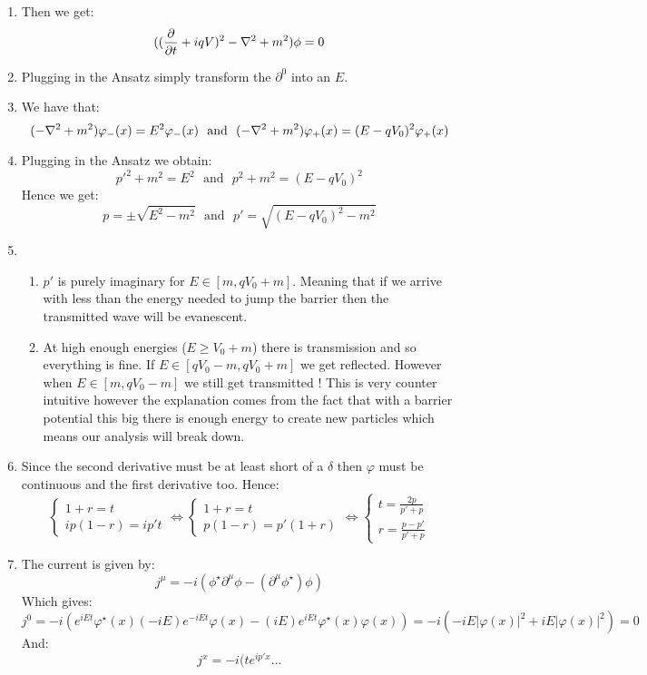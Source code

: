 \documentclass[10pt,a4paper]{book}
\begin{document}
\begin{enumerate}

\item Then we get:
\[
((\pdv{}{t} + i q V)^2 - \laplacian + m^2) \phi = 0
\]

\item Plugging in the Ansatz simply transform the $\partial^0$ into an $E$.

\item We have that:
\[
(-\laplacian + m^2) \varphi_-(x) = E^2 \varphi_- (x) \mbox{~~and~~} (-\laplacian + m^2) \varphi_+(x) = (E - qV_0)^2 \varphi_+(x)
\]

\item Plugging in the Ansatz we obtain:
\[
p'^2 + m^2 = E^2 \mbox{~~and~~} p^2 + m^2 = (E - q V_0)^2
\]
Hence we get:
\[
p = \pm \sqrt{E^2 - m^2} \mbox{~~and~~} p' = \sqrt{(E - qV_0)^2 - m^2}
\]

\item \begin{enumerate}

\item $p'$ is purely imaginary for $E \in [m , q V_0 + m]$. Meaning that if we arrive with less than the energy needed to jump the barrier then the transmitted wave will be evanescent. 

\item At high enough energies ($E \geq V_0 + m$) there is transmission and so everything is fine. If $E \in [q V_0 - m, q V_0 + m]$ we get reflected. However when $E \in [m, qV_0 - m]$ we still get transmitted ! This is very counter intuitive however the explanation comes from the fact that with a barrier potential this big there is enough energy to create new particles which means our analysis will break down. 

\end{enumerate}

\item Since the second derivative must be at least short of a $\delta$ then $\varphi$ must be continuous and the first derivative too. Hence:
\[
\begin{cases}
1 + r = t\\
ip(1 - r) = ip' t
\end{cases} \Leftrightarrow
\begin{cases}
1 + r = t\\
p(1 - r) = p' (1 + r) 
\end{cases}
\Leftrightarrow
\begin{cases}
t = \frac{2p}{p' + p}\\
r = \frac{p - p'}{p' + p}
\end{cases}
\]

\item The current is given by:
\[
j^\mu = - i(\phi^\star \partial^\mu \phi - (\partial^\mu \phi^\star) \phi)
\]
Which gives:
\[
j^0 = - i (e^{i E t} \varphi^\star(x) (-iE) e^{-iE t} \varphi(x) - (iE) e^{iEt}\varphi^\star(x) \varphi(x)) = - i( -i E|\varphi(x)|^2 + i E |\varphi(x)|^2 ) = 0
\]
And:
\[
j^x = - i ( t e^{i p' x}...
\]

\end{enumerate}
\end{document}
